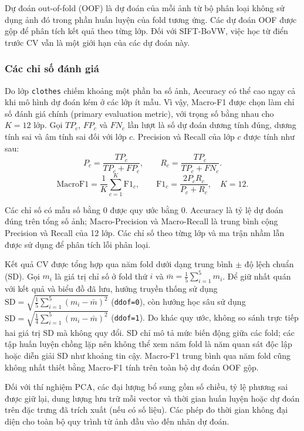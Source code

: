 Dự đoán out-of-fold (OOF) là dự đoán của mỗi ảnh từ bộ phân loại không sử dụng ảnh đó trong phần huấn luyện của fold tương ứng. Các dự đoán OOF được gộp để phân tích kết quả theo từng lớp. Đối với SIFT-BoVW, việc học từ điển trước CV vẫn là một giới hạn của các dự đoán này.

\subsubsection{Các chỉ số đánh giá}
Do lớp \texttt{clothes} chiếm khoảng một phần ba số ảnh, Accuracy có thể cao ngay cả khi mô hình dự đoán kém ở các lớp ít mẫu. Vì vậy, Macro-F1 được chọn làm chỉ số đánh giá chính (primary evaluation metric), với trọng số bằng nhau cho $K=12$ lớp. Gọi $TP_c$, $FP_c$ và $FN_c$ lần lượt là số dự đoán dương tính đúng, dương tính sai và âm tính sai đối với lớp $c$. Precision và Recall của lớp $c$ được tính như sau:
\[
P_c=\frac{TP_c}{TP_c+FP_c},\qquad R_c=\frac{TP_c}{TP_c+FN_c}.
\]
\begin{equation}\label{eq:macro}
\mathrm{MacroF1}=\frac{1}{K}\sum_{c=1}^{K}\mathrm{F1}_c,\qquad
\mathrm{F1}_c=\frac{2P_cR_c}{P_c+R_c},\quad K=12.
\end{equation}

Các chỉ số có mẫu số bằng 0 được quy ước bằng 0. Accuracy là tỷ lệ dự đoán đúng trên tổng số ảnh; Macro-Precision và Macro-Recall là trung bình cộng Precision và Recall của 12 lớp. Các chỉ số theo từng lớp và ma trận nhầm lẫn được sử dụng để phân tích lỗi phân loại.

Kết quả CV được tổng hợp qua năm fold dưới dạng trung bình $\pm$ độ lệch chuẩn (SD). Gọi $m_i$ là giá trị chỉ số ở fold thứ $i$ và $\bar m=\frac{1}{5}\sum_{i=1}^{5}m_i$. Để giữ nhất quán với kết quả và biểu đồ đã lưu, hướng truyền thống sử dụng $\mathrm{SD}=\sqrt{\frac{1}{5}\sum_{i=1}^{5}(m_i-\bar m)^2}$ (\texttt{ddof=0}), còn hướng học sâu sử dụng $\mathrm{SD}=\sqrt{\frac{1}{4}\sum_{i=1}^{5}(m_i-\bar m)^2}$ (\texttt{ddof=1}). Do khác quy ước, không so sánh trực tiếp hai giá trị SD mà không quy đổi. SD chỉ mô tả mức biến động giữa các fold; các tập huấn luyện chồng lặp nên không thể xem năm fold là năm quan sát độc lập hoặc diễn giải SD như khoảng tin cậy. Macro-F1 trung bình qua năm fold cũng không nhất thiết bằng Macro-F1 tính trên toàn bộ dự đoán OOF gộp.

Đối với thí nghiệm PCA, các đại lượng bổ sung gồm số chiều, tỷ lệ phương sai được giữ lại, dung lượng lưu trữ mỗi vector và thời gian huấn luyện hoặc dự đoán trên đặc trưng đã trích xuất (nếu có số liệu). Các phép đo thời gian không đại diện cho toàn bộ quy trình từ ảnh đầu vào đến nhãn dự đoán.

